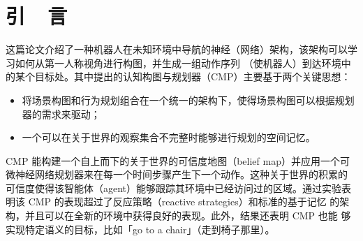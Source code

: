 \documentclass{thuemp}
\begin{document}



\wuhao 

\section{引~~言}
\enlargethispage{-3.3cm}
这篇论文介绍了一种机器人在未知环境中导航的神经（网络）架构，该架构可以学习如何从第一人称视角进行构图，并生成一组动作序列
（使机器人）到达环境中的某个目标处。其中提出的认知构图与规划器（CMP）主要基于两个关键思想：
\begin{itemize}
  \item 将场景构图和行为规划组合在一个统一的架构下，使得场景构图可以根据规划器的需求来驱动；
  \item 一个可以在关于世界的观察集合不完整时能够进行规划的空间记忆。
\end{itemize}

CMP 能构建一个自上而下的关于世界的可信度地图（belief map）并应用一个可
微神经网络规划器来在每一个时间步骤产生下一个动作。这种关于世界的积累的
可信度使得该智能体（agent）能够跟踪其环境中已经访问过的区域。通过实验表
明该 CMP 的表现超过了反应策略（reactive strategies）和标准的基于记忆
的架构，并且可以在全新的环境中获得良好的表现。此外，结果还表明 CMP 也能
够实现特定语义的目标，比如「go to a chair」（走到椅子那里）。
\end{document}
